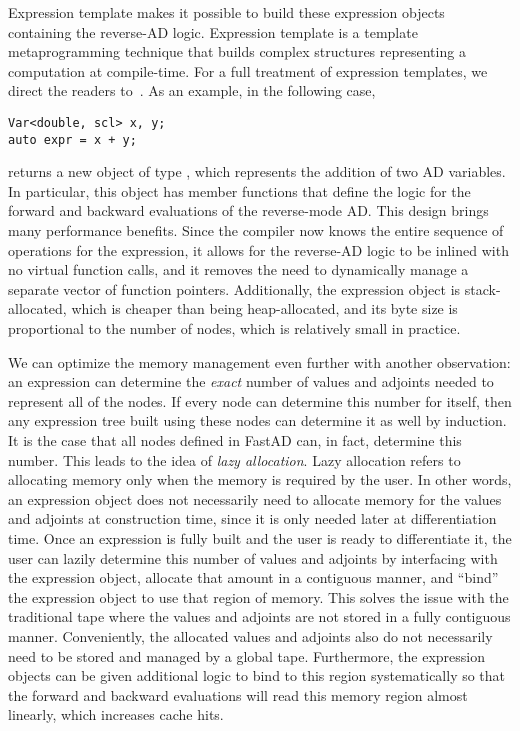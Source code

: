 Expression template makes it possible to build these expression objects containing the reverse-AD logic.
Expression template is a template metaprogramming technique that builds complex
structures representing a computation at compile-time.
For a full treatment of expression templates, we direct the readers to~\cite{vandevoorde:2002}.
As an example, in the following case,
\begin{lstlisting}[style=customcpp]
Var<double, scl> x, y;
auto expr = x + y;
\end{lstlisting}
 returns a new object of type
,
which represents the addition of two AD variables.
In particular, this object has member functions that define the logic for
the forward and backward evaluations of the reverse-mode AD.\@
This design brings many performance benefits.
Since the compiler now knows the entire sequence of operations for the expression,
it allows for the reverse-AD logic to be inlined with no virtual function calls,
and it removes the need to dynamically manage a separate vector of function pointers.
Additionally, the expression object is stack-allocated,
which is cheaper than being heap-allocated,
and its byte size is proportional to the number of nodes,
which is relatively small in practice.

We can optimize the memory management even further with another observation:
an expression can determine the \emph{exact} number of values and adjoints needed to represent all of the nodes.
If every node can determine this number for itself,
then any expression tree built using these nodes can determine it as well by induction.
It is the case that all nodes defined in FastAD can, in fact, determine this number.
This leads to the idea of \emph{lazy allocation}.
Lazy allocation refers to allocating memory only when the memory is required by the user.
In other words, an expression object does not necessarily need to 
allocate memory for the values and adjoints at construction time,
since it is only needed later at differentiation time.
Once an expression is fully built and the user is ready to differentiate it,
the user can lazily determine this number of values and adjoints by interfacing with the expression object,
allocate that amount in a contiguous manner,
and ``bind'' the expression object to use that region of memory.
This solves the issue with the traditional tape where the values and adjoints are
not stored in a fully contiguous manner.
Conveniently, the allocated values and adjoints also do not necessarily 
need to be stored and managed by a global tape.
Furthermore, the expression objects can be given additional logic 
to bind to this region systematically so that the forward and backward evaluations
will read this memory region almost linearly, which increases cache hits.


